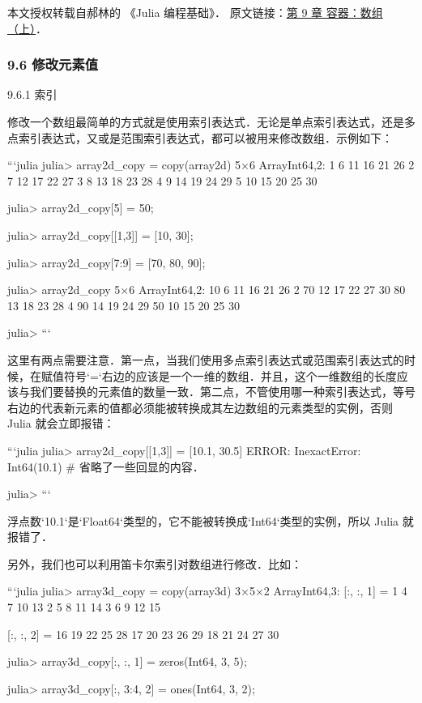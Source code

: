 
本文授权转载自郝林的 《Julia 编程基础》． 原文链接：\href{https://github.com/hyper0x/JuliaBasics/blob/master/book/ch09.md}{第 9 章 容器：数组（上）}．


\subsubsection{9.6 修改元素值}

9.6.1 索引

修改一个数组最简单的方式就是使用索引表达式．无论是单点索引表达式，还是多点索引表达式，又或是范围索引表达式，都可以被用来修改数组．示例如下：

```julia
julia> array2d_copy = copy(array2d)
5×6 Array{Int64,2}:
 1   6  11  16  21  26
 2   7  12  17  22  27
 3   8  13  18  23  28
 4   9  14  19  24  29
 5  10  15  20  25  30

julia> array2d_copy[5] = 50;

julia> array2d_copy[[1,3]] = [10, 30];

julia> array2d_copy[7:9] = [70, 80, 90];

julia> array2d_copy
5×6 Array{Int64,2}:
 10   6  11  16  21  26
  2  70  12  17  22  27
 30  80  13  18  23  28
  4  90  14  19  24  29
 50  10  15  20  25  30

julia> 
```

这里有两点需要注意．第一点，当我们使用多点索引表达式或范围索引表达式的时候，在赋值符号`=`右边的应该是一个一维的数组．并且，这个一维数组的长度应该与我们要替换的元素值的数量一致．第二点，不管使用哪一种索引表达式，等号右边的代表新元素的值都必须能被转换成其左边数组的元素类型的实例，否则 Julia 就会立即报错：

```julia
julia> array2d_copy[[1,3]] = [10.1, 30.5]
ERROR: InexactError: Int64(10.1)
# 省略了一些回显的内容．

julia> 
```

浮点数`10.1`是`Float64`类型的，它不能被转换成`Int64`类型的实例，所以 Julia 就报错了．

另外，我们也可以利用笛卡尔索引对数组进行修改．比如：

```julia
julia> array3d_copy = copy(array3d)
3×5×2 Array{Int64,3}:
[:, :, 1] =
 1  4  7  10  13
 2  5  8  11  14
 3  6  9  12  15

[:, :, 2] =
 16  19  22  25  28
 17  20  23  26  29
 18  21  24  27  30

julia> array3d_copy[:, :, 1] = zeros(Int64, 3, 5);

julia> array3d_copy[:, 3:4, 2] = ones(Int64, 3, 2);

